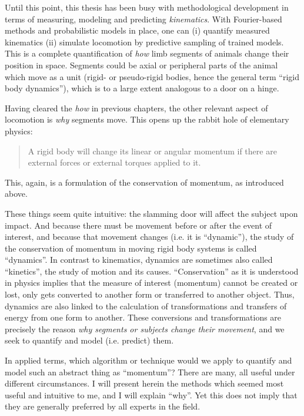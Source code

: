 \documentclass[10pt,a4paper]{article}
\begin{document}
Until this point, this thesis has been busy with methodological development in terms of measuring, modeling and predicting \emph{kinematics}.
With Fourier-based methods and probabilistic models in place, one can
  (i) quantify measured kinematics
  (ii) simulate locomotion by predictive sampling of trained models.
This is a complete quantification of \emph{how} limb segments of animals change their position in space.
Segments could be axial or peripheral parts of the animal which move as a unit (rigid- or pseudo-rigid bodies, hence the general term ``rigid body dynamics''), which is to a large extent analogous to a door on a hinge.

Having cleared the \emph{how} in previous chapters, the other relevant aspect of locomotion is \emph{why} segments move.
This opens up the rabbit hole of elementary physics:
\begin{quote}
A rigid body will change its linear or angular momentum if there are external forces or external torques applied to it.
\end{quote}
This, again, is a formulation of the conservation of momentum, as introduced above.

These things seem quite intuitive: the slamming door will affect the subject upon impact.
And because there must be movement before or after the event of interest, and because that movement changes (i.e. it is ``dynamic''), the study of the conservation of momentum in moving rigid body systems is called ``dynamics''.
In contrast to kinematics, dynamics are sometimes also called ``kinetics'', the study of motion and its causes.
``Conservation'' as it is understood in physics implies that the measure of interest (momentum) cannot be created or lost, only gets converted to another form or transferred to another object.
Thus, dynamics are also linked to the calculation of transformations and transfers of energy from one form to another.
These conversions and transformations are precisely the reason \emph{why segments or subjects change their movement}, and we seek to quantify and model (i.e. predict) them.


In applied terms, which algorithm or technique would we apply to quantify and model such an abstract thing as ``momentum''?
There are many, all useful under different circumstances.
I will present herein the methods which seemed most useful and intuitive to me, and I will explain ``why''.
Yet this does not imply that they are generally preferred by all experts in the field.
\end{document}
